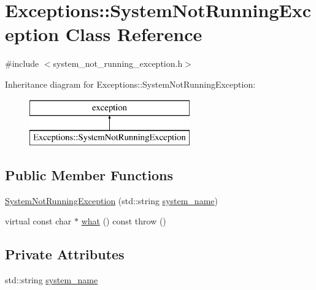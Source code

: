 \hypertarget{class_exceptions_1_1_system_not_running_exception}{}\section{Exceptions\+:\+:System\+Not\+Running\+Exception Class Reference}
\label{class_exceptions_1_1_system_not_running_exception}


{\ttfamily \#include $<$system\+\_\+not\+\_\+running\+\_\+exception.\+h$>$}

Inheritance diagram for Exceptions\+:\+:System\+Not\+Running\+Exception\+:\begin{figure}[H]
\begin{center}
\leavevmode
\includegraphics[height=2.000000cm]{class_exceptions_1_1_system_not_running_exception}
\end{center}
\end{figure}
\subsection*{Public Member Functions}
\begin{DoxyCompactItemize}
\item 
\hyperlink{class_exceptions_1_1_system_not_running_exception_aed32e775ba2eb68ff70446c138c40bcc}{System\+Not\+Running\+Exception} (std\+::string \hyperlink{class_exceptions_1_1_system_not_running_exception_af97cd0ba9e5c5b4aa57b99028b6bb95a}{system\+\_\+name})
\item 
virtual const char $\ast$ \hyperlink{class_exceptions_1_1_system_not_running_exception_afc7a24ce91303377321104405996f5ff}{what} () const   throw ()
\end{DoxyCompactItemize}
\subsection*{Private Attributes}
\begin{DoxyCompactItemize}
\item 
std\+::string \hyperlink{class_exceptions_1_1_system_not_running_exception_af97cd0ba9e5c5b4aa57b99028b6bb95a}{system\+\_\+name}
\end{DoxyCompactItemize}


